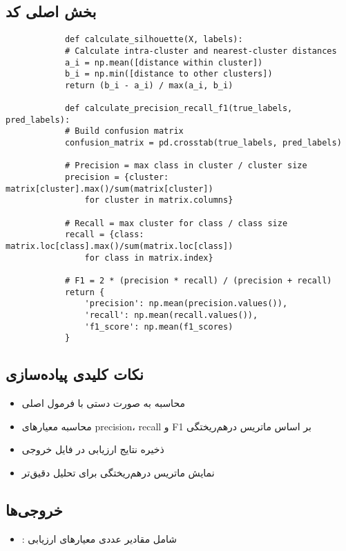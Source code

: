 \documentclass[a4paper,12pt]{article}
\begin{document}
	\subsection{بخش اصلی کد}
	\begin{latin}
		\begin{verbatim}
			def calculate_silhouette(X, labels):
			# Calculate intra-cluster and nearest-cluster distances
			a_i = np.mean([distance within cluster])
			b_i = np.min([distance to other clusters])
			return (b_i - a_i) / max(a_i, b_i)
			
			def calculate_precision_recall_f1(true_labels, pred_labels):
			# Build confusion matrix
			confusion_matrix = pd.crosstab(true_labels, pred_labels)
			
			# Precision = max class in cluster / cluster size
			precision = {cluster: matrix[cluster].max()/sum(matrix[cluster]) 
				for cluster in matrix.columns}
			
			# Recall = max cluster for class / class size
			recall = {class: matrix.loc[class].max()/sum(matrix.loc[class]) 
				for class in matrix.index}
			
			# F1 = 2 * (precision * recall) / (precision + recall)
			return {
				'precision': np.mean(precision.values()),
				'recall': np.mean(recall.values()),
				'f1_score': np.mean(f1_scores)
			}
		\end{verbatim}
	\end{latin}
	
	\subsection{نکات کلیدی پیاده‌سازی}
	\begin{itemize}
		\item محاسبه  به صورت دستی با فرمول اصلی
		\item محاسبه معیارهای precision، recall و F1 بر اساس ماتریس درهم‌ریختگی
		\item ذخیره نتایج ارزیابی در فایل خروجی
		\item نمایش ماتریس درهم‌ریختگی برای تحلیل دقیق‌تر
	\end{itemize}
	
	\subsection{خروجی‌ها}
	\begin{itemize}
		\item {}: شامل مقادیر عددی معیارهای ارزیابی
		
	\end{itemize}
	
\end{document}
